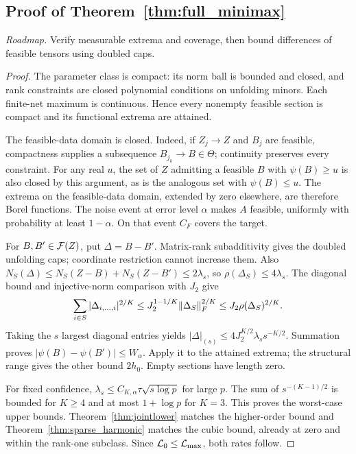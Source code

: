 \subsection{Proof of Theorem~\ref{thm:full_minimax}}
\noindent\emph{Roadmap.} Verify measurable extrema and coverage, then bound differences of feasible tensors using doubled caps.
\begin{proof}
The parameter class is compact: its norm ball is bounded and closed, and rank constraints are closed polynomial conditions on unfolding minors. Each finite-net maximum is continuous. Hence every nonempty feasible section is compact and its functional extrema are attained.

The feasible-data domain is closed. Indeed, if $Z_j\to Z$ and $B_j$ are feasible, compactness supplies a subsequence $B_{j_k}\to B\in\Theta$; continuity preserves every constraint.
For any real $u$, the set of $Z$ admitting a feasible $B$ with $\psi(B)\ge u$ is also closed by this argument, as is the analogous set with $\psi(B)\le u$.
The extrema on the feasible-data domain, extended by zero elsewhere, are therefore Borel functions.
The noise event at error level $\alpha$ makes $A$ feasible, uniformly with probability at least $1-\alpha$. On that event $C_F$ covers the target.

For $B,B'\in{\cal F}(Z)$, put $\Delta=B-B'$.
Matrix-rank subadditivity gives the doubled unfolding caps; coordinate restriction cannot increase them. Also
$N_S(\Delta)\le N_S(Z-B)+N_S(Z-B')\le2\lambda_s$,
so $\rho(\Delta_S)\le4\lambda_s$.
The diagonal bound and injective-norm comparison with $J_2$ give
\[
 \sum_{i\in S}|\Delta_{i,\ldots,i}|^{2/K}
 \le J_2^{1-1/K}\lVert \Delta_S\rVert_F^{2/K}
 \le J_2\rho(\Delta_S)^{2/K}.
\]
Taking the $s$ largest diagonal entries yields
$|\Delta|_{(s)}\le4J_2^{K/2}\lambda_s s^{-K/2}$.
Summation proves $|\psi(B)-\psi(B')|\le W_\alpha$.
Apply it to the attained extrema; the structural range gives the other bound $2h_0$. Empty sections have length zero.

For fixed confidence, $\lambda_s\le C_{K,\alpha}\tau\sqrt{s\log p}$ for large $p$.
The sum of $s^{-(K-1)/2}$ is bounded for $K\ge4$ and at most $1+\log p$ for $K=3$.
This proves the worst-case upper bounds.
Theorem~\ref{thm:jointlower} matches the higher-order bound and
Theorem~\ref{thm:sparse_harmonic} matches the cubic bound, already at zero and within the rank-one subclass. Since $\mathcal L_0\le\mathcal L_{\max}$, both rates follow.
\end{proof}


